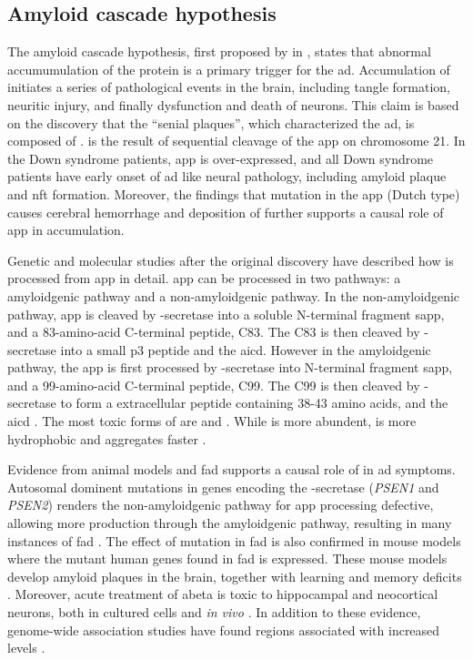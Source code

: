 \subsection{Amyloid cascade hypothesis\label{amy-hypo}}
The amyloid cascade hypothesis, first proposed by \citeauthor{hardy92} in \citeyear{hardy92}, states that abnormal accumumulation of the protein \abeta is a primary trigger for the \gls{ad}. Accumulation of \abeta initiates a series of pathological events in the brain, including tangle formation, neuritic injury, and finally dysfunction and death of neurons. This claim is based on the discovery that the ``senial plaques'', which characterized the \gls{ad}, is composed of \abeta \citep{masters85}. \abeta is the result of sequential cleavage of the \gls{app} on chromosome 21. In the Down syndrome patients, \gls{app} is over-expressed, and all Down syndrome patients have early onset of \gls{ad} like neural pathology, including amyloid plaque and \gls{nft} formation\citep{wisniewski85, hardy02}. Moreover, the findings that mutation in the \gls{app} (Dutch type) causes cerebral hemorrhage and deposition of \abeta further supports a causal role of \gls{app} in \abeta accumulation.

Genetic and molecular studies after the original discovery have described how \abeta is processed from \gls{app} in detail. \gls{app} can be processed in two pathways: a amyloidgenic pathway and a non-amyloidgenic pathway. In the non-amyloidgenic pathway, \gls{app} is cleaved by \textalpha-secretase into a soluble N-terminal fragment s\gls{app}\textalpha, and a 83-amino-acid C-terminal peptide, C83. The C83 is then cleaved by \textgamma-secretase into a small p3 peptide and the \gls{aicd}. However in the amyloidgenic pathway, the \gls{app} is first processed by \textbeta-secretase into N-terminal fragment s\gls{app}\textbeta, and a 99-amino-acid C-terminal peptide, C99. The C99 is then cleaved by \textgamma-secretase to form a extracellular peptide containing 38-43 amino acids, \abeta and the \gls{aicd} \citep{barage15}. The most toxic forms of \abeta are \abeta[40] and \abeta[42]. While \abeta[40] is more abundent, \abeta[42] is more hydrophobic and aggregates faster \citep{walsh07}. 

Evidence from animal models and \gls{fad} supports a causal role of \abeta in \gls{ad} symptoms. Autosomal dominent mutations in genes encoding the \textgamma-secretase (\textit{PSEN1} and \textit{PSEN2}) renders the non-amyloidgenic pathway for \gls{app} processing defective, allowing more \abeta production through the amyloidgenic pathway, resulting in many instances of \gls{fad} \citep{suzuki94, levy-lahad95, rogaev95}. The effect of mutation in \gls{fad} is also confirmed in mouse models where the mutant human genes found in \gls{fad} is expressed. These mouse models develop amyloid plaques in the brain, together with learning and memory deficits \citep{hsiao96, dodart99, chishti01, westerman02}. Moreover, acute treatment of \gls{abeta} is toxic to hippocampal and neocortical neurons, both in cultured cells and \textit{in vivo} \citep{lacor04, shankar08}. In addition to these evidence, genome-wide association studies have found regions associated with increased \abeta levels \citep{kehoe99, myers00}.


